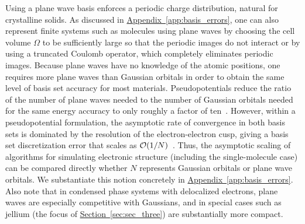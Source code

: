\documentclass[superscriptaddress,aps,pra,nofootinbib,notitlepage,10pt,longbibliography]{revtex4-1}
\renewcommand{\sec}[1]{\hyperref[sec:#1]{Section~\ref*{sec:#1}}}
\DeclareRobustCommand{\app}[1]{\hyperref[app:#1]{Appendix~\ref*{app:#1}}}
\begin{document}
Using a plane wave basis enforces a periodic charge distribution, natural for crystalline solids. As discussed in \app{basis_errors}, one can also represent finite systems such as molecules using plane waves by choosing the cell volume $\Omega$ to be sufficiently large so that the periodic images do not interact \cite{Martin2004} or by using a truncated Coulomb operator, which completely
eliminates periodic images\cite{fusti2002accurate}. Because plane waves have no knowledge of the atomic positions, one requires more plane waves than Gaussian orbitals in order to obtain the same level of basis set accuracy for most materials. Pseudopotentials reduce the ratio of the number of plane waves needed to the number of Gaussian orbitals needed for the same energy accuracy to only roughly a factor of ten~\cite{tosoni2007comparison,booth2016plane}. However, within a pseudopotential formulation, the asymptotic rate of convergence in both basis sets is dominated by the resolution of the electron-electron cusp, giving a basis set discretization error that scales as ${\cal O}(1/N)$~\cite{gruneis2013explicitly,hattig2011explicitly}. Thus, the asymptotic scaling of algorithms for simulating electronic structure (including the single-molecule case) can be compared directly whether $N$ represents Gaussian orbitals or plane wave orbitals. We substantiate this notion concretely in \app{basis_errors}. Also note that
in condensed phase systems with delocalized electrons, plane waves are especially competitive with Gaussians, and
in special cases such as jellium (the focus of \sec{sec_three}) are substantially more compact.
\end{document}
